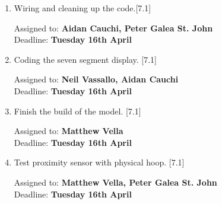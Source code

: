 \documentclass[11pt,a4paper]{article}
\begin{document}
\begin{enumerate}
\begin{enumerate}
\item Wiring and cleaning up the code.[7.1]
\begin{flushright}
	Assigned to: \textbf{Aidan Cauchi, Peter Galea St. John} \\
	Deadline: \textbf{Tuesday 16th April}
\end{flushright}

\item Coding the seven segment display. [7.1]
\begin{flushright}
	Assigned to: \textbf{Neil Vassallo, Aidan Cauchi} \\
	Deadline: \textbf{Tuesday 16th April}
\end{flushright}

\item Finish the build of the model. [7.1]
\begin{flushright}
	Assigned to: \textbf{Matthew Vella} \\
	Deadline: \textbf{Tuesday 16th April}
\end{flushright}

\item Test proximity sensor with physical hoop. [7.1]
\begin{flushright}
	Assigned to: \textbf{Matthew Vella,  Peter Galea St. John} \\
	Deadline: \textbf{Tuesday 16th April}
\end{flushright}

\end{enumerate}	
\end{enumerate}
\end{document}
